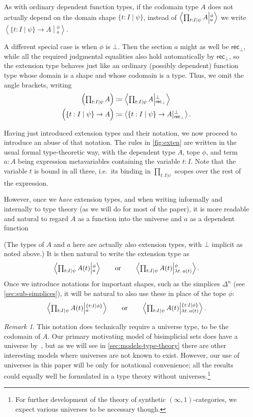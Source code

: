 \documentclass{amsart}
\theoremstyle{plain}
\theoremstyle{definition}
\theoremstyle{remark}
\newtheorem{rmk}[thm]{Remark}
\numberwithin{equation}{section}
\newcommand{\tprod}{\textstyle\prod}
\newcommand{\exten}[4]{\left\langle\mathchoice{\textstyle\prod_{#1}}{\textstyle\prod_{#1}}{\scriptstyle\prod_{#1}}{\scriptscriptstyle\prod_{#1}} #2 \middle|^{#3}_{#4}\right\rangle}
\newcommand{\ndexten}[4]{\left\langle #1 \to #2 \middle|^{#3}_{#4}\right\rangle}
\newcommand{\defeq}{\coloneqq}
\newcommand{\univtype}{\mathcal{U}}
\newcommand{\sh}[2]{\{#1\mid #2\}}
\newcommand{\rec}{\mathsf{rec}}
\newcommand{\lam}[1]{\lambda #1.\,}
\newcommand{\Parens}[1]{\Bigl(#1\Bigr)}
\begin{document}
As with ordinary dependent function types, if the codomain type $A$ does not actually depend on the domain shape $\sh{t:I}{\psi}$, instead of $\exten{t:I \mid \psi}{A}{\phi}{a}$ we write $\ndexten{\sh{t:I}{\psi}}{A}{\phi}{a}$.

A different special case is when $\phi$ is $\bot$.
Then the section $a$ might as well be $\rec_\bot$, while all the required judgmental equalities also hold automatically by $\rec_\bot$, so the extension type behaves just like an ordinary (possibly dependent) function type whose domain is a shape and whose codomain is a type.
Thus, we omit the angle brackets, writing
\begin{align}
  \Parens{\tprod_{t:I|\psi} A} &\defeq \exten{t:I|\psi}{A}{\bot}{\rec_\bot}\label{eq:exten-bot}\\
  \Parens{\sh{t:I}{\psi} \to A} &\defeq \ndexten{\sh{t:I}{\psi}}{A}{\bot}{\rec_\bot}.\label{eq:ndexten-bot}
\end{align}

Having just introduced extension types and their notation, we now proceed to introduce an abuse of that notation.
The rules in \cref{fig:exten} are written in the usual formal type-theoretic way, with the dependent type $A$, tope $\phi$, and term $a:A$ being expression metavariables containing the variable $t:I$.
Note that the variable $t$ is bound in all three, i.e.\ its binding in $\prod_{t:I|\psi}$ scopes over the rest of the expression.

However, once we \emph{have} extension types, and when writing informally and internally to type theory (as we will do for most of the paper), it is more readable and natural to regard $A$ as a function into the universe and $a$ as a dependent function
(The types of $A$ and $a$ here are actually also extension types, with $\bot$ implicit as noted above.)
It is then natural to write the extension type as
\[ \exten{t:I\mid\psi}{A(t)}{\phi}{a} \qquad\text{or}\qquad \exten{t:I\mid\psi}{A(t)}{\phi}{\lam{t}a(t)}. \]
Once we introduce notations for important shapes, such as the simplices $\Delta^n$ (see \cref{sec:sub-simplices}), it will be natural to also use these in place of the tope $\phi$:
\[ \exten{t:I\mid\psi}{A(t)}{\sh{t:I}{\phi}}{a} \qquad\text{or}\qquad \exten{t:I\mid\psi}{A(t)}{\sh{t:I}{\phi}}{\lam{t}a(t)}. \]

\begin{rmk}\label{sec:notation}
This notation does technically require a universe type, to be the codomain of $A$.
Our primary motivating model of bisimplicial sets does have a universe by~\cite{elreedy}, but as we will see in \cref{sec:models-type-theory} there are other interesting models where universes are not known to exist.
However, our use of universes in this paper will be only for notational convenience; all the results could equally well be formulated in a type theory without universes.\footnote{For further development of the theory of synthetic $(\infty,1)$-categories, we expect various universes to be necessary though.}
\end{rmk}
\end{document}
